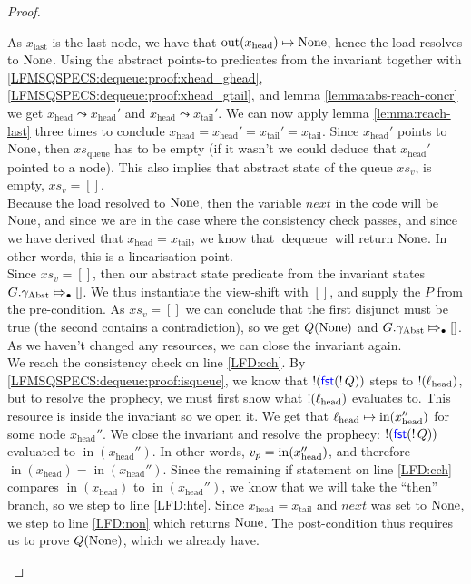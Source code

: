\documentclass[a4paper, 10pt]{report}
\theoremstyle{definition}
\newcommand{\dequeue}{\operatorname{dequeue}}
\newcommand{\xsqueue}{xs_{\mathrm{queue}}}
\newcommand{\locN}[1]{\loc_{\mathrm{#1}}}
\newcommand{\lochead}{\locN{head}}
\newcommand{\nIn}[1]{\operatorname{in}(#1)}
\newcommand{\nOut}[1]{\operatorname{out}(#1)}
\newcommand{\node}{x}
\newcommand{\nodeN}[1]{\node_{\mathrm{#1}}}
\newcommand{\nodehead}{\nodeN{head}}
\newcommand{\nodetail}{\nodeN{tail}}
\newcommand{\nodelast}{\nodeN{last}}
\newcommand{\absvalueList}{xs_v}
\newcommand{\prophval}{\val_p}
\newcommand{\Qg}{G}
\newcommand{\gabst}{\gname_{\mathrm{Abst}}}
\newcommand{\abstractstateauth}[2]{#1 \Mapsto_{\bullet} #2}
\newcommand{\reach}[2]{#1 \leadsto #2}
\begin{document}
\begin{proof}
\begin{itemize}
\begin{itemize}
      As $\nodelast$ is the last node, we have that $\nOut{\nodehead} \mapsto \None$, hence the load resolves to $\operatorname{None}$. Using the abstract points-to predicates from the invariant together with \ref{LFMSQSPECS:dequeue:proof:xhead_ghead}, \ref{LFMSQSPECS:dequeue:proof:xhead_gtail}, and lemma \ref{lemma:abs-reach-concr} we get $\reach{\nodehead}{\nodehead'}$ and $\reach{\nodehead}{\nodetail'}$. We can now apply lemma \ref{lemma:reach-last} three times to conclude $\nodehead = \nodehead' = \nodetail' = \nodetail$. Since $\nodehead'$ points to $\operatorname{None}$, then $\xsqueue$ has to be empty (if it wasn't we could deduce that $\nodehead'$ pointed to a node). This also implies that abstract state of the queue $\absvalueList$, is empty, $\absvalueList = []$.\\
      Because the load resolved to $\operatorname{None}$, then the variable $next$ in the code will be $\operatorname{None}$, and since we are in the case where the consistency check passes, and since we have derived that $\nodehead = \nodetail$, we know that $\dequeue$ will return $\operatorname{None}$. In other words, this is a linearisation point.\\
      Since $\absvalueList = []$, then our abstract state predicate from the invariant states $\abstractstateauth{\Qg.\gabst}{[]}$. We thus instantiate the view-shift with $[]$, and supply the $P$ from the pre-condition. As $\absvalueList = []$ we can conclude that the first disjunct must be true (the second contains a contradiction), so we get $Q(\operatorname{None})$ and $\abstractstateauth{\Qg.\gabst}{[]}$. As we haven't changed any resources, we can close the invariant again.\\
      We reach the consistency check on line \ref{LFD:cch}. By \ref{LFMSQSPECS:dequeue:proof:isqueue}, we know that $\mathop{!}(\operatorname{\textsf{\color{blue} fst}} (\mathop{!} Q))$ steps to $\deref(\lochead)$, but to resolve the prophecy, we must first show what $\deref(\lochead)$ evaluates to. This resource is inside the invariant so we open it. We get that $\lochead \mapsto \nIn{\nodehead''}$ for some node $\nodehead''$. We close the invariant and resolve the prophecy: $\mathop{!}(\operatorname{\textsf{\color{blue} fst}} (\mathop{!} Q))$ evaluated to $\nIn{\nodehead''}$. In other words, $\prophval = \nIn{\nodehead''}$, and therefore $\nIn{\nodehead} = \nIn{\nodehead''}$. Since the remaining if statement on line \ref{LFD:cch} compares $\nIn{\nodehead}$ to $\nIn{\nodehead''}$, we know that we will take the ``then'' branch, so we step to line \ref{LFD:hte}. Since $\nodehead = \nodetail$ and $next$ was set to $\operatorname{None}$, we step to line \ref{LFD:non} which returns $\operatorname{None}$. The post-condition thus requires us to prove $Q(\operatorname{None})$, which we already have.


\end{itemize}
\end{itemize}
\end{proof}
\end{document}
